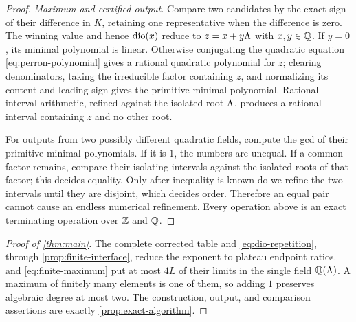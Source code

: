\begin{proof}
\smallskip
\noindent\emph{Maximum and certified output.}
Compare two candidates by the exact sign of their difference in $K$, retaining
one representative when the difference is zero.  The winning value and hence
$\operatorname{dio}(x)$ reduce to $z=x+y\Lambda$ with $x,y\in\mathbb{Q}$.  If $y=0$, its minimal
polynomial is linear.  Otherwise conjugating the quadratic equation
\eqref{eq:perron-polynomial} gives a rational quadratic polynomial for $z$;
clearing denominators, taking the irreducible factor containing $z$, and
normalizing its content and leading sign gives the primitive minimal
polynomial.  Rational interval arithmetic, refined against the isolated root
$\Lambda$, produces a rational interval containing $z$ and no other root.

For outputs from two possibly different quadratic fields, compute the gcd of
their primitive minimal polynomials.  If it is $1$, the numbers are unequal.
If a common factor remains, compare their isolating intervals against the
isolated roots of that factor; this decides equality.  Only after inequality
is known do we refine the two intervals until they are disjoint, which decides
order.  Therefore an equal pair cannot cause an endless numerical refinement.
Every operation above is an exact terminating operation over $\mathbb{Z}$ and $\mathbb{Q}$.
\end{proof}

\begin{proof}[Proof of \cref{thm:main}]
The complete corrected table and \eqref{eq:dio-repetition}, through
\cref{prop:finite-interface}, reduce the exponent to plateau endpoint ratios.
 and
\eqref{eq:finite-maximum} put at most $4L$ of their limits in the single field
$\mathbb{Q}(\Lambda)$.  A maximum of finitely many elements is one of them, so adding
$1$ preserves algebraic degree at most two.  The construction, output, and
comparison assertions are exactly \cref{prop:exact-algorithm}.
\end{proof}
